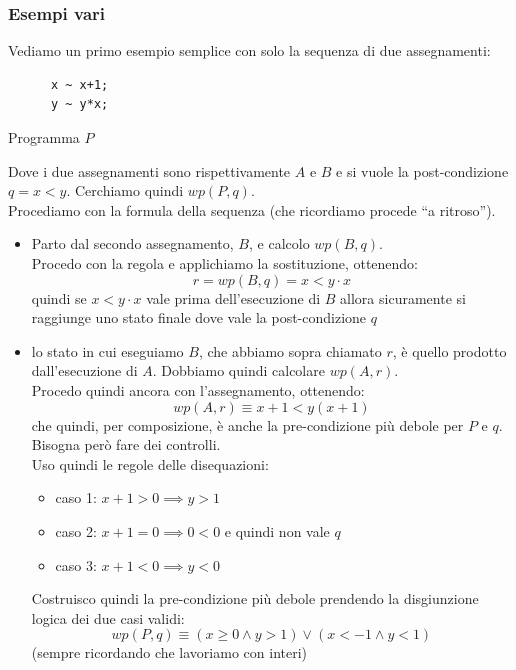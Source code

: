 				      				\subsubsection{Esempi vari}
				      				\begin{esempio}
				      					Vediamo un primo esempio semplice con solo la sequenza di due assegnamenti:
				      					\begin{listing}[H]
				      						\begin{lstlisting}
      x ~ x+1;
      y ~ y*x;
				      					\end{lstlisting}
				      					\caption{Programma $P$}
				      					\end{listing}
				      					Dove i due assegnamenti sono rispettivamente $A$ e $B$ e si vuole la
				      					post-condizione $q=x<y$. Cerchiamo quindi $wp(P, q)$.\\
				      					Procediamo con la formula della sequenza (che ricordiamo procede ``a
				      					ritroso'').
				      					\begin{itemize}
				      						\item Parto dal secondo assegnamento, $B$, e calcolo $wp(B, q)$.\\
				      						      Procedo con la regola e applichiamo la sostituzione, ottenendo:
				      						      \[r=wp(B, q)=x<y\cdot x\]
				      						      quindi se $x<y\cdot x$ vale prima dell'esecuzione di $B$ allora sicuramente
				      						      si raggiunge uno stato finale dove vale la post-condizione $q$ 
				      						\item lo stato in cui eseguiamo $B$, che abbiamo sopra chiamato $r$, è
				      						      quello prodotto dall'esecuzione di $A$. Dobbiamo quindi calcolare
				      						      $wp(A, r)$.\\
				      						      Procedo quindi ancora con l'assegnamento, ottenendo:
				      						      \[wp(A, r)\equiv x+1<y(x+1)\]
				      						      che quindi, per composizione, è anche la pre-condizione più debole per $P$ e
				      						      $q$. Bisogna però fare dei controlli.\\
				      						      Uso quindi le regole delle disequazioni:
				      						      \begin{itemize}
				      						      	\item caso 1: $x+1>0\implies y>1$
				      						      	\item caso 2: $x+1=0\implies 0<0$ e quindi non vale $q$
				      						      	\item caso 3: $x+1<0\implies y<0$
				      						      \end{itemize}
				      						      Costruisco quindi la pre-condizione più debole prendendo la disgiunzione
				      						      logica dei due casi validi:
				      						      \[wp(P, q)\equiv(x\geq 0\land y>1)\lor (x<-1\land y<1)\]
				      						      (sempre ricordando che lavoriamo con interi)
				      					\end{itemize}
				      				\end{esempio}
